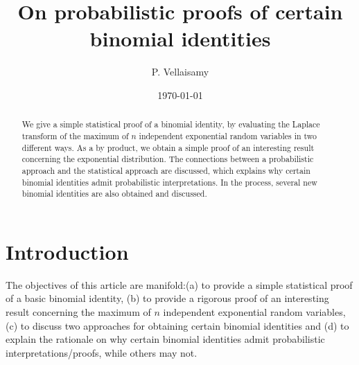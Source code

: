 \documentclass[11pt]{amsart}
\title{ O\lowercase{n}  p\lowercase{robabilistic} p\lowercase{roofs of} c\lowercase{ertain} b\lowercase{inomial} i\lowercase{dentities}}
\author{P. Vellaisamy}
\date{\today}
\numberwithin{equation}{section}
\begin{document}
\begin{abstract}
We give a simple statistical proof of a binomial identity, by evaluating the Laplace transform of the maximum of $n$ independent exponential random variables in two different ways. As a by product, we obtain a simple proof of an interesting result concerning the exponential distribution. The connections between a probabilistic approach and the statistical approach are discussed, which explains why certain binomial identities admit probabilistic interpretations. In the process, several new binomial identities are also obtained
and discussed.
\end{abstract}
\maketitle
\section{Introduction} 
The objectives of this article are manifold:(a) to provide a simple statistical proof of a basic binomial identity, (b) to provide a rigorous proof of an interesting result concerning the maximum of $n$ independent exponential random variables, (c) to discuss two approaches  for obtaining certain binomial identities and (d) to explain the rationale on why certain binomial identities admit probabilistic interpretations/proofs, while others may not.
\end{document}

